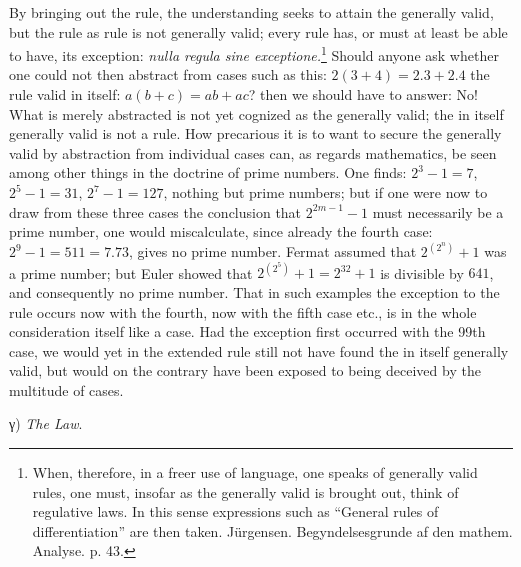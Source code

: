 \documentclass[12pt,a4paper,openany]{book}
\newcommand{\opage}[1]{\marginnote{\footnotesize\textit{[#1]}}}
\begin{document}
By bringing out the rule, the understanding seeks to attain the
generally valid, but the rule as rule is not generally valid;
every rule has, or must at least be able to have, its
exception: \textit{nulla regula sine exceptione.}\footnote[1]{When, therefore, in a freer use of language, one speaks of generally valid rules, one must, insofar as the generally valid is brought out, think of regulative laws. In this sense expressions such as ``General rules of differentiation'' are then taken. Jürgensen. Begyndelsesgrunde af den mathem. Analyse. p. 43.} Should anyone
ask whether one could not then abstract from cases such as this: $2(3+4)=2.3+2.4$ the rule valid in itself: $a(b+c)=ab+ac$? then we should have to answer:
No! What is merely abstracted is not yet cognized as the
generally valid; the in itself generally valid is not a rule.
How precarious it is to want to secure the generally valid by abstraction from individual
cases can, as regards mathematics, be seen among other things
in the doctrine of prime numbers. One
finds: $2^{3}-1=7$, $2^{5}-1=31$, $2^{7}-1=127$, nothing but
prime numbers; but if one were now to draw from these three cases
the conclusion that $2^{2m-1}-1$ must necessarily be a
prime number, one would miscalculate, since already the fourth case: $2^{9}-1=511=7.73$, gives no prime number.
Fermat assumed that $2^{(2^{n})}+1$ was a prime number; but Euler
showed that $2^{(2^{5})}+1=2^{32}+1$ is divisible by $641$, and consequently no prime number. That in such examples the exception to
the rule occurs now with the fourth, now with the fifth
case etc., is in the whole consideration itself like a case.
Had the exception first occurred with the 99th case,
we would yet in the extended rule still not have
found the in itself generally valid, but would on the contrary have been exposed
to being deceived by the multitude of cases.
\setcounter{footnote}{0}%
\opage{16}
\begin{center}γ) \emph{The Law}.\end{center}
\end{document}
